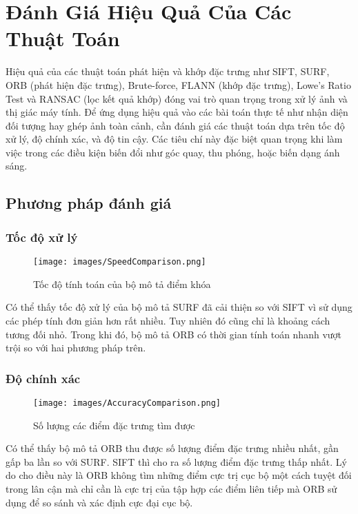 \newpage
\section{Đánh Giá Hiệu Quả Của Các Thuật Toán}

Hiệu quả của các thuật toán phát hiện và khớp đặc trưng như SIFT, SURF, ORB (phát hiện đặc trưng), Brute-force, FLANN (khớp đặc trưng), Lowe's Ratio Test và RANSAC (lọc kết quả khớp) đóng vai trò quan trọng trong xử lý ảnh và thị giác máy tính. Để ứng dụng hiệu quả vào các bài toán thực tế như nhận diện đối tượng hay ghép ảnh toàn cảnh, cần đánh giá các thuật toán dựa trên tốc độ xử lý, độ chính xác, và độ tin cậy. Các tiêu chí này đặc biệt quan trọng khi làm việc trong các điều kiện biến đổi như góc quay, thu phóng, hoặc biến dạng ánh sáng.

\subsection{Phương pháp đánh giá}
\subsubsection{Tốc độ xử lý}
\begin{figure}[H]
	\centering
	\texttt{[image: images/SpeedComparison.png]}
	\caption{Tốc độ tính toán của bộ mô tả điểm khóa}
\end{figure}
Có thể thấy tốc độ xử lý của bộ mô tả SURF đã cải thiện so với SIFT vì sử dụng các phép tính đơn giản hơn rất nhiều. Tuy nhiên đó cũng chỉ là khoảng cách tương đối nhỏ. Trong khi đó, bộ mô tả ORB có thời gian tính toán nhanh vượt trội so với hai phương pháp trên.
\subsubsection{Độ chính xác}
\begin{figure}[H]
	\centering
	\texttt{[image: images/AccuracyComparison.png]}
	\caption{Số lượng các điểm đặc trưng tìm được}
\end{figure}
Có thể thấy bộ mô tả ORB thu được số lượng điểm đặc trưng nhiều nhất, gần gấp ba lần so với SURF. SIFT thì cho ra số lượng điểm đặc trưng thấp nhất. Lý do cho điều này là ORB không tìm những điểm cực trị cục bộ một cách tuyệt đối trong lân cận mà chỉ cần là cực trị của tập hợp các điểm liên tiếp mà ORB sử dụng để so sánh và xác định cực đại cục bộ.
